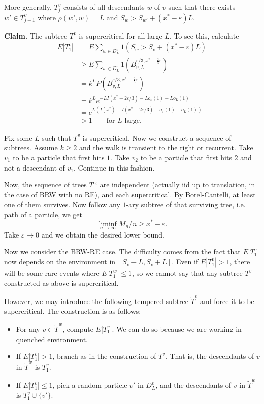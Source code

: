 More generally, $T^v_j$ consists of all descendants $w$ of $v$ such that there exists $w' \in T^v_{j -1}$ where $\rho(w', w) = L$ and $S_w > S_{w'} + (x^* - \varepsilon) L$.

\textbf{Claim.} The subtree $T^v$ is supercritical for all large $L$.
To see this, calculate
\begin{align*}
	E|T^v_1|
	&= E \sum_{w \in D^{v}_{L}} 1\left( S_w > S_v + (x^* - \varepsilon) L \right)  \\
	&\geq E \sum_{w \in D^{v}_{L}} 1\left( B^{\varepsilon / 3, x^* - \frac{2}{3}\varepsilon}_{v, L}\right)  \\
	&= k^L P\left( B^{\varepsilon / 3, x^* - \frac{2}{3}\varepsilon}_{v, L} \right)  \\
	&= k^L e^{- LI(x^* - 2 \varepsilon / 3) - L o_\varepsilon(1) - L o_L(1)} \\
	&= e^{L(I(x^*) - I(x^* - 2 \varepsilon / 3) - o_\varepsilon(1) - o_L(1))} \\
	&> 1 \qquad \text{for $L$ large}
.\end{align*}

Fix some $L$ such that $T^v$ is supercritical. Now we construct a sequence of subtrees. Assume $k \ge 2$ and the walk is transient to the right or recurrent. Take $v_1$ to be a particle that first hits $1$. Take $v_2$ to be a particle that first hits $2$ and not a descendant of $v_1$. Continue in this fashion.

Now, the sequence of trees $T^{v_i}$ are independent (actually iid up to translation, in the case of BRW with no RE), and each supercritical. By Borel-Cantelli, at least one of them survives. Now follow any $1$-ary subtree of that surviving tree, i.e. path of a particle, we get
\[
	\liminf_{n \to \infty } M_n / n \ge x^* - \varepsilon
.\] 
Take $\varepsilon \to 0$ and we obtain the desired lower bound.

Now we consider the BRW-RE case. The difficulty comes from the fact that $E|T^v_1|$ now depends on the environment in $[S_v - L, S_v + L]$. Even if $E|T^0_1| > 1$, there will be some rare events where $E|T^w_1| \le 1$, so we cannot say that any subtree $T^v$ constructed as above is supercritical.

However, we may introduce the following tempered subtree $\tilde T ^v$ and force it to be supercritical. The construction is as follows:
\begin{itemize}
	\item For any $v \in \tilde T^w$, compute $E|T^v_1|$. We can do so because we are working in quenched environment.
	\item If $E|T^v_1| > 1$, branch as in the construction of $T^v$. That is, the descendants of $v$ in $\tilde T^w$ is $T^v_1$.
	\item If $E|T^v_1|\le 1$, pick a random particle $v'$ in $D^v_L$, and the descendants of $v$ in $\tilde T^w$ is $T^v_1 \cup \{v'\} $.
\end{itemize}

